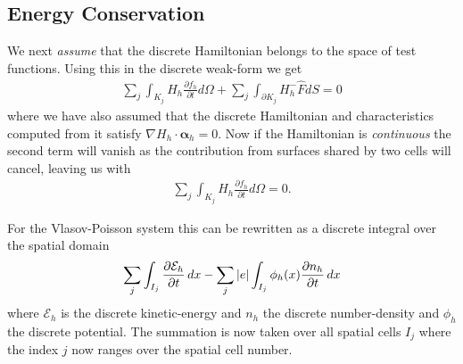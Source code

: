 \documentclass[11pt, reqno]{amsart}
\newcommand{\pfrac}[2]{\frac{\partial #1}{\partial #2}}
\newcommand{\mvec}[1]{\mathbf{#1}}
\newcommand{\gvec}[1]{\boldsymbol{#1}}
\theoremstyle{definition}
\begin{document}


\subsection{Energy Conservation}

We next \emph{assume} that the discrete Hamiltonian belongs to the
space of test functions. Using this in the discrete weak-form we get
\begin{align}
  \sum_j\int_{K_j} H_h\pfrac{f_h}{t}d\Omega + 
  \sum_j \int_{\partial K_j}H_h^-
  \hat{F}dS 
  = 0
\end{align}
where we have also assumed that the discrete Hamiltonian and
characteristics computed from it satisfy $\nabla H_h \cdot
\gvec{\alpha}_h = 0$. Now if the Hamiltonian is \emph{continuous} the
second term will vanish as the contribution from surfaces shared by
two cells will cancel, leaving us with
\begin{align}
  \sum_j\int_{K_j} H_h\pfrac{f_h}{t}d\Omega = 0.
\end{align}

For the Vlasov-Poisson system this can be rewritten as a discrete
integral over the spatial domain
\begin{align}
  \sum_{j}\int_{I_{j}} \pfrac{\mathcal{E}_h}{t}\thinspace dx
  -
  \sum_{j}
  |e|
  \int_{I_{j}}
  \phi_h(x)
  \pfrac{n_h}{t}
  \thinspace dx
  \label{eq:dis-energy-1}
\end{align}
where $\mathcal{E}_h$ is the discrete kinetic-energy and $n_h$ the
discrete number-density and $\phi_h$ the discrete potential. The
summation is now taken over all spatial cells $I_{j}$ where the index
$j$ now ranges over the spatial cell number.
\end{document}
